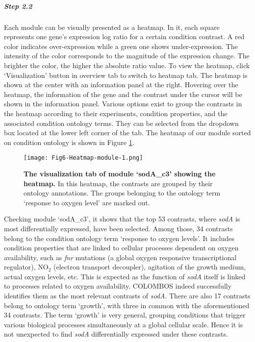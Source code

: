 \begin{small}
\subparagraph{Step 2.2}	Each module can be visually presented as a heatmap. 
In it, each square represents one gene's expression log ratio for a certain
condition contrast. A red color indicates over-expression while a green one
shows under-expression. The intensity of the color corresponds to the
magnitude of the expression change. The brighter the color, the higher the
absolute ratio value.
%
To view the heatmap, click `Visualization' button in overview tab to switch to
heatmap tab.  The heatmap is shown at the center with an information panel at
the right. Hovering over the heatmap, the information of the gene and the
contrast under the cursor will be shown in the information panel. Various
options exist to group the contrasts in the heatmap according to their
experiments, condition properties, and the associated condition ontology
terms. They can be selected from the dropdown box located at the lower left
corner of the tab. The heatmap of our module sorted on condition ontology is
shown in Figure \ref{fig:colombos-heatmap-m1}.
%
\begin{figure}[tb]
	\centering
  	\texttt{[image: Fig6-Heatmap-module-1.png]}
	\caption[Heatmap of module `sodA\_c3']{\textbf{The visualization tab of 
	module `sodA\_c3' showing the heatmap.}
	In this heatmap, the contrasts are grouped by their ontology annotations. 
	The groups belonging to the ontology term `response to oxygen 
	level' are marked out.}
	\label{fig:colombos-heatmap-m1}
\end{figure}

\end{small} %

Checking module `sodA\_c3', it shows that the top 53 contrasts, where
\textit{sodA} is most differentially expressed, have been selected. Among
those, 34 contrasts belong to the condition ontology term `response to oxygen
levels'.  It includes condition properties that are linked to cellular
processes dependent on oxygen availability, such as \textit{fnr} mutations (a
global oxygen responsive transcriptional regulator), NO$_2$ (electron
transport decoupler), agitation of the growth medium, actual oxygen levels,
etc. This is expected as the function of \textit{sodA} itself is linked to 
processes related to oxygen availability.
COLOMBOS indeed successfully identifies them as the most relevant contrasts of
\textit{sodA}. 
%
There are also 17 contrasts belong to ontology term `growth', with three in
common with the aforementioned 34 contrasts. The term `growth' is very
general, grouping conditions that trigger various biological processes
simultaneously at a global cellular scale. Hence it is not unexpected to find
\textit{sodA} differentially expressed under these contrasts.




